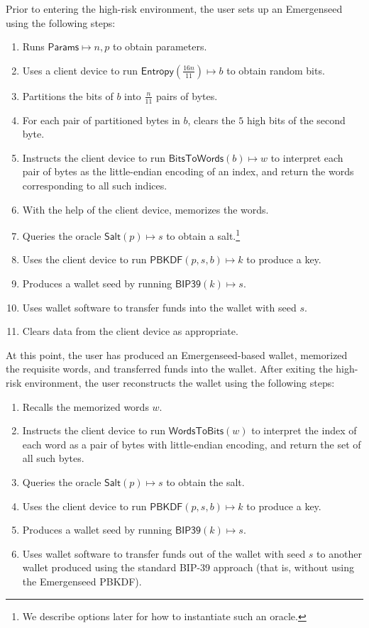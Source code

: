\documentclass{article}
\begin{document}
Prior to entering the high-risk environment, the user sets up an Emergenseed using the following steps:
\begin{enumerate}
	\item Runs $\mathsf{Params} \mapsto n, p$ to obtain parameters.
	\item Uses a client device to run $\mathsf{Entropy}\left( \frac{16n}{11} \right) \mapsto b$ to obtain random bits.
	\item Partitions the bits of $b$ into $\frac{n}{11}$ pairs of bytes.
	\item For each pair of partitioned bytes in $b$, clears the $5$ high bits of the second byte.
	\item Instructs the client device to run $\mathsf{BitsToWords}(b) \mapsto w$ to interpret each pair of bytes as the little-endian encoding of an index, and return the words corresponding to all such indices.
	\item With the help of the client device, memorizes the words.
	\item Queries the oracle $\mathsf{Salt}(p) \mapsto s$ to obtain a salt.\footnote{We describe options later for how to instantiate such an oracle.}
	\item Uses the client device to run $\mathsf{PBKDF}(p, s, b) \mapsto k$ to produce a key.
	\item Produces a wallet seed by running $\mathsf{BIP39}(k) \mapsto s$.
	\item Uses wallet software to transfer funds into the wallet with seed $s$.
	\item Clears data from the client device as appropriate.
\end{enumerate}

At this point, the user has produced an Emergenseed-based wallet, memorized the requisite words, and transferred funds into the wallet.
After exiting the high-risk environment, the user reconstructs the wallet using the following steps:
\begin{enumerate}
	\item Recalls the memorized words $w$.
	\item Instructs the client device to run $\mathsf{WordsToBits}(w)$ to interpret the index of each word as a pair of bytes with little-endian encoding, and return the set of all such bytes.
	\item Queries the oracle $\mathsf{Salt}(p) \mapsto s$ to obtain the salt.
	\item Uses the client device to run $\mathsf{PBKDF}(p, s, b) \mapsto k$ to produce a key.
	\item Produces a wallet seed by running $\mathsf{BIP39}(k) \mapsto s$.
	\item Uses wallet software to transfer funds out of the wallet with seed $s$ to another wallet produced using the standard BIP-39 approach (that is, without using the Emergenseed PBKDF).
\end{enumerate}
\end{document}
